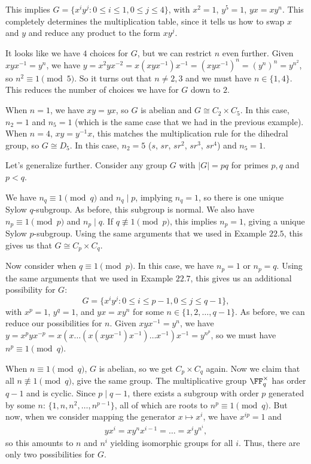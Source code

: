 This implies $G = \{x^iy^j : 0\leq i\leq 1, 0\leq j\leq 4\}$, with $x^2=1$, $y^5=1$, $yx = xy^n$. This completely determines the multiplication table, since it tells us how to swap $x$ and $y$ and reduce any product to the form $xy^j$.

It looks like we have $4$ choices for $G$, but we can restrict $n$ even further. Given $xyx^{-1}=y^n$, we have $y = x^2yx^{-2} = x(xyx^{-1})x^{-1} = (xyx^{-1})^n = (y^{n})^n = y^{n^2}$, so $n^2\equiv 1\pmod{5}$. So it turns out that $n\neq 2,3$ and we must have $n\in \{1,4\}$. This reduces the number of choices we have for $G$ down to $2$.

When $n=1$, we have $xy=yx$, so $G$ is abelian and $G\cong C_2\times C_5$. In this case, $n_2=1$ and $n_5=1$ (which is the same case that we had in the previous example). When $n=4$, $xy = y^{-1}x$, this matches the multiplication rule for the dihedral group, so $G\cong D_5$. In this case, $n_2=5$ ($s$, $sr$, $sr^2$, $sr^3$, $sr^4$) and $n_5 = 1$.

\begin{example}
\exlabel 

Let's generalize further. Consider any group $G$ with $\vert G\vert = pq$ for primes $p,q$ and $p < q$.
\end{example}

We have $n_q\equiv 1\pmod{q}$ and $n_q\mid p$, implying $n_q=1$, so there is one unique Sylow $q$-subgroup. As before, this subgroup is normal. We also have $n_p\equiv 1\pmod{p}$ and $n_p\mid q$. If $q\not\equiv 1\pmod{p}$, this implies $n_p=1$, giving a unique Sylow $p$-subgroup. Using the same arguments that we used in Example $22.5$, this gives us that $G\cong C_p\times C_q$.

Now consider when $q\equiv 1\pmod{p}$. In this case, we have $n_p=1$ or $n_p=q$. Using the same arguments that we used in Example $22.7$, this gives us an additional possibility for $G$:
\[G = \{x^iy^j : 0\leq i\leq p-1, 0\leq j\leq q-1\},\]
with $x^p=1$, $y^q=1$, and $yx=xy^n$ for some $n\in \{1,2,\hdots, q-1\}$. As before, we can reduce our possibilities for $n$. Given $xyx^{-1} = y^n$, we have $y = x^pyx^{-p} = x(x\hdots (x (xyx^{-1})x^{-1})\hdots x^{-1})x^{-1} = y^{n^p}$, so we must have $n^p\equiv 1\pmod{q}$. 

When $n\equiv 1\pmod{q}$, $G$ is abelian, so we get $C_p\times C_q$ again. Now we claim that all $n\not\equiv 1\pmod{q}$, give the same group. The multiplicative group $\FF_q^\times$ has order $q-1$ and is cyclic. Since $p \mid q-1$, there exists a subgroup with order $p$ generated by some $n$: $\{1, n, n^2, \hdots, n^{p-1}\}$, all of which are roots to $n^p\equiv 1\pmod{q}$. But now, when we consider mapping the generator $x\mapsto x^{i}$, we have $x^{ip} = 1$ and 
\begin{align*}
    yx^i = xy^nx^{i-1} = \hdots = x^iy^{n^i},
\end{align*}
so this amounts to $n$ and $n^i$ yielding isomorphic groups for all $i$. Thus, there are only two possibilities for $G$. 
